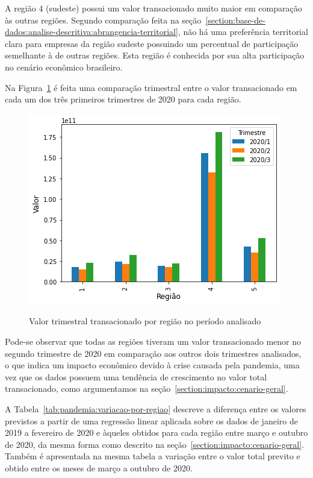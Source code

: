 A região 4 (sudeste) possui um valor transacionado muito maior em comparação às outras regiões. Segundo comparação feita na seção~\ref{section:base-de-dados:analise-descritiva:abrangencia-territorial}, não há uma preferência territorial clara para empresas da região sudeste possuindo um percentual de participação semelhante à de outras regiões. Esta região é conhecida por sua alta participação no cenário econômico brasileiro.

Na Figura~\ref{fig:pandemia:base-de-dados-21.1-valor-trimestral-por-regiao} é feita uma comparação trimestral entre o valor transacionado em cada um dos três primeiros trimestres de 2020 para cada região.

\begin{figure}[htb]
	\centering
    \caption{Valor trimestral transacionado por região no período analisado}
    \includegraphics[scale=0.7]{images/base-de-dados-21.1-valor-trimestral-por-regiao.png}
    \label{fig:pandemia:base-de-dados-21.1-valor-trimestral-por-regiao}
    \fdadospesquisa
\end{figure}

Pode-se observar que todas as regiões tiveram um valor transacionado menor no segundo trimestre de 2020 em comparação aos outros dois trimestres analisados, o que indica um impacto econômico devido à crise causada pela pandemia, uma vez que os dados possuem uma tendência de crescimento no valor total transacionado, como argumentamos na seção~\ref{section:impacto:cenario-geral}.

A Tabela~\ref{tab:pandemia:variacao-por-regiao} descreve a diferença entre os valores previstos a partir de uma regressão linear aplicada sobre os dados de janeiro de 2019 a fevereiro de 2020 e àqueles obtidos para cada região entre março e outubro de 2020, da mesma forma como descrito na seção~\ref{section:impacto:cenario-geral}. Também é apresentada na mesma tabela a variação entre o valor total previto e obtido entre os meses de março a outubro de 2020.

